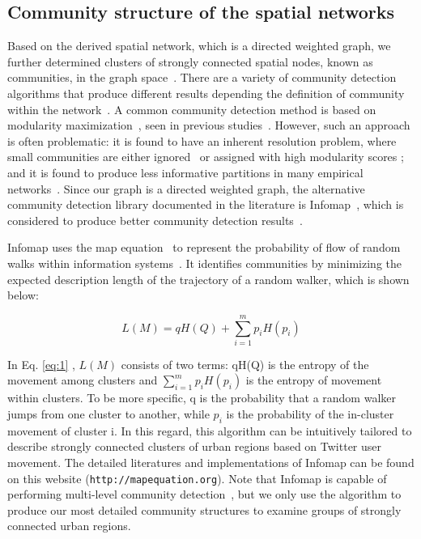 \documentclass[]{tGIS2e}
\begin{document}
\subsection{Community structure of the spatial networks}
Based on the derived spatial network, which is a directed weighted graph, we further determined clusters of strongly connected spatial nodes, known as communities, in the graph space~\citep{coscia2011}. 
There are a variety of community detection algorithms that produce different results depending the definition of community within the network~\citep{coscia2011}.
A common community detection method is based on modularity maximization~\citep{newman2006}, seen in previous studies~\citep{hawelka,ratti2010,song2012}.
However, such an approach is often problematic: it is found to have an inherent resolution problem, where small communities are either ignored~\citep{fortunato2007} or assigned with high modularity scores \citep{guimera2004}; and it is found to produce less informative partitions in many empirical networks~\citep{good2010}.
Since our graph is a directed weighted graph, the alternative community detection library documented in the literature is Infomap~\citep{domenico2015,rosvall2008}, which is considered to produce better community detection results~\citep{lancichinetti2009}.

Infomap uses the map equation~\citep{rosvall2010} to represent the probability of flow of random walks within information systems~\citep{rosvall2008}.
It identifies communities by minimizing the expected description length of the trajectory of a random walker, which is shown below:

\begin{equation} \label{eq:1}
L(M)=qH(Q) + \sum_{i=1}^{m} p_{i}H(p_{i})
\end{equation}

In Eq. \eqref{eq:1} , $L(M)$ consists of two terms: qH(Q) is the entropy of the movement among clusters and $ \sum_{i=1}^{m} p_{i}H(p_{i})$ is the entropy of movement within clusters. 
To be more specific, q is the probability that a random walker jumps from one cluster to another, while $p_i$ is the probability of the in-cluster movement of cluster i.
In this regard, this algorithm can be intuitively tailored to describe strongly connected clusters of urban regions based on Twitter user movement.
The detailed literatures and implementations of Infomap can be found on this website ({\tt{http://mapequation.org}}).
Note that Infomap is capable of performing multi-level community detection~\cite{domenico2015}, but we only use the algorithm to produce our most detailed community structures
to examine groups of strongly connected urban regions.
\end{document}
